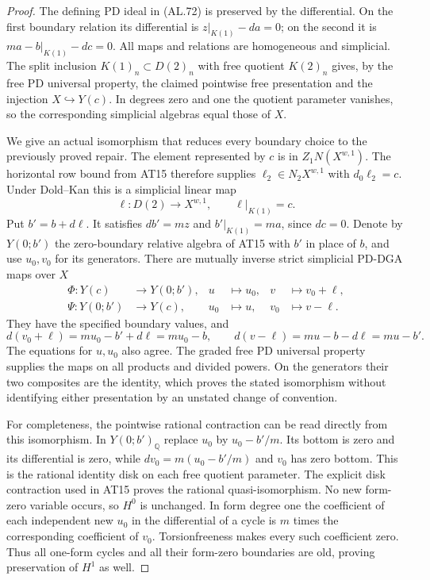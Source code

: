 \begin{proof}
The defining PD ideal in \textup{(AL.72)} is preserved by the
differential. On the first boundary relation its differential
is $z|_{K(1)}-da=0$; on the second it is
$ma-b|_{K(1)}-dc=0$.
All maps and relations are homogeneous and simplicial.
The split inclusion $K(1)_n\subset D(2)_n$ with free quotient
$K(2)_n$ gives, by the free PD universal property, the claimed
pointwise free presentation and the injection $X\hookrightarrow
Y(c)$. In degrees zero and one the quotient parameter vanishes,
so the corresponding simplicial algebras equal those of $X$.

We give an actual isomorphism that reduces every boundary choice
to the previously proved repair. The element represented by $c$
is in $Z_1N(X^{w,1})$. The horizontal row bound from AT15
therefore supplies $\ell_2\in N_2X^{w,1}$ with $d_0\ell_2=c$.
Under Dold--Kan this is a simplicial linear map
\[
       \ell:D(2)\longrightarrow X^{w,1},
       \qquad \ell|_{K(1)}=c.
\]
Put $b'=b+d\ell$. It satisfies $db'=mz$ and
$b'|_{K(1)}=ma$, since $dc=0$.
Denote by $Y(0;b')$ the zero-boundary relative algebra of AT15
with $b'$ in place of $b$, and use $u_0,v_0$ for its generators.
There are mutually inverse strict simplicial PD-DGA maps over $X$
\[
 \begin{aligned}
 \Phi:Y(c)&\longrightarrow Y(0;b'),&
       u&\longmapsto u_0,&v&\longmapsto v_0+\ell,\\
 \Psi:Y(0;b')&\longrightarrow Y(c),&
       u_0&\longmapsto u,&v_0&\longmapsto v-\ell.
 \end{aligned}
 \tag{AL.74}
\]
They have the specified boundary values, and
\[
 d(v_0+\ell)=mu_0-b'+d\ell=mu_0-b,
 \qquad d(v-\ell)=mu-b-d\ell=mu-b'.
\]
The equations for $u,u_0$ also agree. The graded free PD
universal property supplies the maps on all products and divided
powers. On the generators their two composites are the identity,
which proves the stated isomorphism without identifying either
presentation by an unstated change of convention.

For completeness, the pointwise rational contraction can be read
directly from this isomorphism. In $Y(0;b')_{\mathbb Q}$ replace
$u_0$ by $u_0-b'/m$. Its bottom is zero and its differential is
zero, while $dv_0=m(u_0-b'/m)$ and $v_0$ has zero bottom.
This is the rational identity disk on each free quotient
parameter. The explicit disk contraction used in AT15 proves
the rational quasi-isomorphism. No new form-zero variable occurs,
so $H^0$ is unchanged. In form degree one the coefficient of
each independent new $u_0$ in the differential of a cycle is
$m$ times the corresponding coefficient of $v_0$.
Torsionfreeness makes every such coefficient zero. Thus all
one-form cycles and all their form-zero boundaries are old,
proving preservation of $H^1$ as well.


\end{proof}
